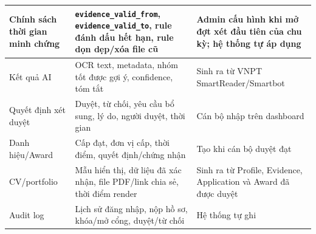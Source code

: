 \begin{longtable}{|>{\raggedright\arraybackslash}p{}|
                  >{\raggedright\arraybackslash}p{}|
                  >{\raggedright\arraybackslash}p{}|}
Chính sách thời gian minh chứng &
\texttt{evidence\_valid\_from}, \texttt{evidence\_valid\_to}, rule đánh dấu hết hạn, rule dọn dẹp/xóa file cũ &
Admin cấu hình khi mở đợt xét đầu tiên của chu kỳ; hệ thống tự áp dụng \\ \hline

Kết quả AI &
OCR text, metadata, nhóm tốt được gợi ý, confidence, tóm tắt &
Sinh ra từ VNPT SmartReader/Smartbot \\ \hline

Quyết định xét duyệt &
Duyệt, từ chối, yêu cầu bổ sung, lý do, người duyệt, thời gian &
Cán bộ nhập trên dashboard \\ \hline

Danh hiệu/Award &
Cấp đạt, đơn vị cấp, thời điểm, quyết định/chứng nhận &
Tạo khi cán bộ duyệt đạt \\ \hline

CV/portfolio &
Mẫu hiển thị, dữ liệu đã xác nhận, file PDF/link chia sẻ, thời điểm render &
Sinh ra từ Profile, Evidence, Application và Award đã được duyệt \\ \hline

Audit log &
Lịch sử đăng nhập, nộp hồ sơ, khóa/mở cổng, duyệt/từ chối &
Hệ thống tự ghi \\ \hline

\end{longtable}
\endgroup